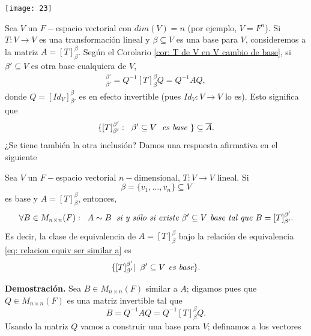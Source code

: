\begin{marginfigure}
\texttt{[image: 23]} 
		\caption{ }
\end{marginfigure}

Sea $V$ un $F-$espacio vectorial
con $dim(V) = n$ (por ejemplo, $V = F^{n}$).
Si $T: V \longrightarrow V$ es una transformación lineal y 
$\beta \subseteq V$ es una base para $V$, consideremos a la
matriz $A = [T]_{\beta}^{\beta}$. 
Según el Corolario \ref{cor: T de V en V cambio de base},
si $\beta' \subseteq V$ es otra base cualquiera de $V$,
\begin{align*}
	[T]_{\beta'}^{\beta'} = Q^{-1} [T]_{\beta}^{\beta} Q = 
	Q^{-1} A Q,
\end{align*}
donde $Q = [Id_{V}]_{\beta'}^{\beta}$ es en efecto invertible
(pues $Id_{V}: V \longrightarrow V$ lo es).
Esto significa que 
\[
\{
[T]_{\beta'}^{\beta'} : \hspace{0.2cm} \beta' \subseteq V
\hspace{0.1cm} \textit{ es base }
\} \subseteq \overline{A}.
\]
¿Se tiene también la otra inclusión?
Damos una respuesta afirmativa en el siguiente

\begin{teo}
	\label{teo: similar a repr matricial de T sii tambien es repr matr de T}
	Sea $V$ un $F-$espacio vectorial $n-$dimensional, $T: V \longrightarrow V$
	lineal. Si $$\beta = \{ v_{1}, \ldots , v_{n} \}
	\subseteq V$$ es base y $A = [T]_{\beta}^{\beta}$, 
	entonces,
	\[
	\forall B \in M_{n \times n}(F): \hspace{0.2cm} A \sim B \hspace{0.2cm}
	\textit{si y sólo si existe } \beta' \subseteq V \textit{ base 
	tal que } B = [T]_{\beta'}^{\beta'}.
	\]
	Es decir, la clase de equivalencia de $A = [T]_{\beta}^{\beta}$
	bajo la relación de equivalencia 
	\eqref{eq: relacion equiv ser similar a} es
	\[
	\{ [T]_{\beta'}^{\beta'}  | \hspace{0.2cm} \beta' \subseteq V \textit{ 
	es base} \}.
	\]
\end{teo}
\noindent
\textbf{Demostración.}
Sea $B \in M_{n \times n}(F)$ similar a $A$; digamos pues que 
$Q \in M_{n \times n}(F)$ es una matriz invertible tal que 
\begin{equation}
	\label{eq: B q menos uno a q}
	B = Q^{-1} A Q = Q^{-1} [T]_{\beta}^{\beta} Q. 
\end{equation} 
Usando la matriz $Q$ vamos a construir una base para $V$; 
definamos a los vectores

